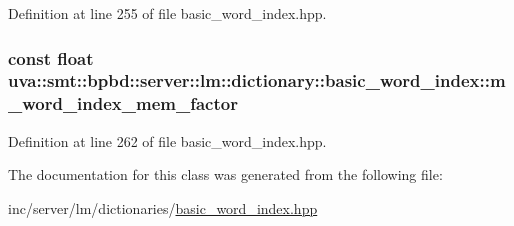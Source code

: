 Definition at line 255 of file basic\+\_\+word\+\_\+index.\+hpp.

\hypertarget{classuva_1_1smt_1_1bpbd_1_1server_1_1lm_1_1dictionary_1_1basic__word__index_aa1c113ede28b36600842da1f8a4652f5}{}
\subsubsection[{m\+\_\+word\+\_\+index\+\_\+mem\+\_\+factor}]{\setlength{\rightskip}{0pt plus 5cm}const float uva\+::smt\+::bpbd\+::server\+::lm\+::dictionary\+::basic\+\_\+word\+\_\+index\+::m\+\_\+word\+\_\+index\+\_\+mem\+\_\+factor\hspace{0.3cm}{\ttfamily [protected]}}\label{classuva_1_1smt_1_1bpbd_1_1server_1_1lm_1_1dictionary_1_1basic__word__index_aa1c113ede28b36600842da1f8a4652f5}


Definition at line 262 of file basic\+\_\+word\+\_\+index.\+hpp.



The documentation for this class was generated from the following file\+:\begin{DoxyCompactItemize}
\item 
inc/server/lm/dictionaries/\hyperlink{basic__word__index_8hpp}{basic\+\_\+word\+\_\+index.\+hpp}\end{DoxyCompactItemize}
